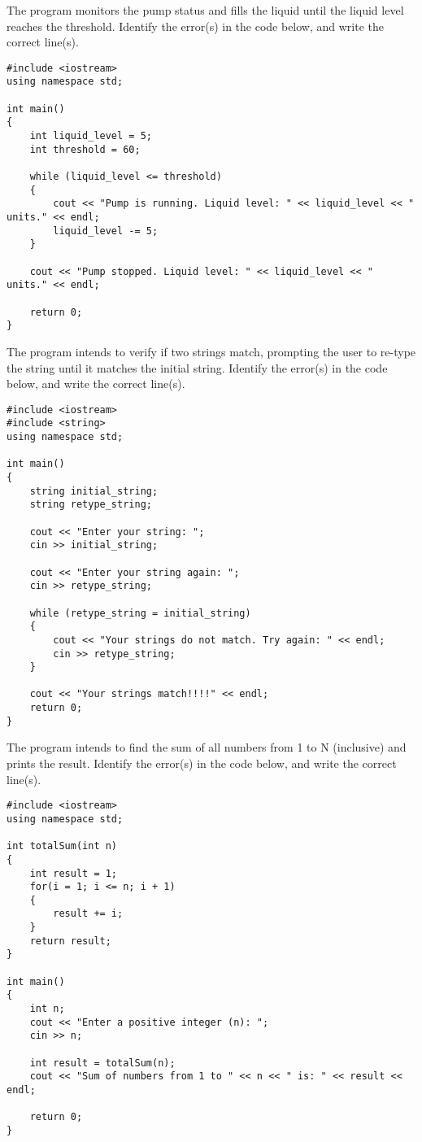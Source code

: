 \begin{multipart}
    The program monitors the pump status and fills the liquid until the liquid level reaches the threshold. Identify the error(s) in the code below, and write the correct line(s).
\end{multipart}

\begin{verbatim}
#include <iostream>
using namespace std;

int main()
{
    int liquid_level = 5;
    int threshold = 60;

    while (liquid_level <= threshold)
    {
        cout << "Pump is running. Liquid level: " << liquid_level << " units." << endl;
        liquid_level -= 5;
    }

    cout << "Pump stopped. Liquid level: " << liquid_level << " units." << endl;

    return 0;
}
\end{verbatim}

\begin{multipart}
The program intends to verify if two strings match, prompting the user to re-type the string until it matches the initial string. Identify the error(s) in the code below, and write the correct line(s).
\end{multipart}

\begin{verbatim}
#include <iostream>
#include <string>
using namespace std;

int main() 
{
    string initial_string;
    string retype_string;

    cout << "Enter your string: ";
    cin >> initial_string;

    cout << "Enter your string again: ";
    cin >> retype_string;

    while (retype_string = initial_string) 
    {
        cout << "Your strings do not match. Try again: " << endl;
        cin >> retype_string;
    }

    cout << "Your strings match!!!!" << endl;
    return 0;
}
\end{verbatim}

\begin{multipart}
The program intends to find the sum of all numbers from 1 to N (inclusive) and prints the result. Identify the error(s) in the code below, and write the correct line(s).
\end{multipart}

\begin{verbatim}
#include <iostream>
using namespace std;

int totalSum(int n)
{
    int result = 1;
    for(i = 1; i <= n; i + 1)
    {
        result += i;
    }
    return result;
}

int main() 
{
    int n;
    cout << "Enter a positive integer (n): ";
    cin >> n;

    int result = totalSum(n);
    cout << "Sum of numbers from 1 to " << n << " is: " << result << endl;

    return 0;
}
\end{verbatim}

